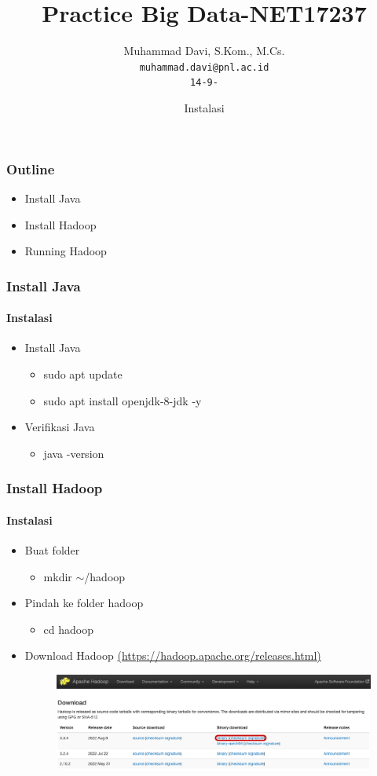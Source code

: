 \documentclass{beamer}
\title{Practice Big Data-NET17237}
\date[8-9-2022]{Instalasi}
\author[Davi]{Muhammad Davi, S.Kom., M.Cs.\\ \texttt{muhammad.davi@pnl.ac.id}\\ 
\texttt{\small 14-9-\the\year{}}}
\begin{document}
  
\newcommand\connect[2]{
	\draw[->,thick] (#1) -| (#2);
	\draw[->,thick] (#2) -| (#1);
}
  
\begin{frame}[t]
\titlepage
\end{frame}

\begin{frame}[t]
\frametitle{Outline}
\begin{itemize}
\item Install Java
\item Install Hadoop
\item Running Hadoop
\end{itemize}
\end{frame}

\begin{frame}[t]
\frametitle{Install Java}
\framesubtitle{Instalasi}
\begin{itemize}
\item Install Java
\begin{itemize}
\item sudo apt update
\item sudo apt install openjdk-8-jdk -y
\end{itemize}
\item Verifikasi Java
\begin{itemize}
\item java -version
\end{itemize}
\end{itemize}
\end{frame}

\begin{frame}[t]
\frametitle{Install Hadoop}
\framesubtitle{Instalasi}
\begin{itemize}
\item Buat folder
\begin{itemize}
\item mkdir $\sim$/hadoop
\end{itemize}
\item Pindah ke folder hadoop
\begin{itemize}
\item cd hadoop
\end{itemize}
\item Download Hadoop \href{https://hadoop.apache.org/releases.html}{(https://hadoop.apache.org/releases.html)}
\begin{figure}
\includegraphics[scale=.25]{download-hadoop-1.png}
\end{figure}
\end{itemize}
\end{frame}
\end{document}
